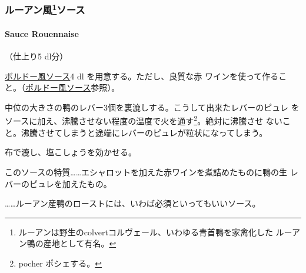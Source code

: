 \begin{recette}
\maeaki

\hypertarget{ux30ebux30fcux30a2ux30f3ux98a884ux30bdux30fcux30b9}{%
\subsubsection[ルーアン風ソース]{\texorpdfstring{ルーアン風\footnote{ルーアンは野生のcolvertコルヴェール、いわゆる青首鴨を家禽化した
  ルーアン鴨の産地として有名。}ソース}{ルーアン風ソース}}\label{ux30ebux30fcux30a2ux30f3ux98a884ux30bdux30fcux30b9}}

\hypertarget{sauce-rouennaise}{%
\paragraph{Sauce Rouennaise}\label{sauce-rouennaise}}


（仕上り5 dl分）

\protect\hyperlink{sauce-bordelaise}{ボルドー風ソース}4 dl
を用意する。ただし、良質な赤
ワインを使って作ること。（\protect\hyperlink{sauce-bordelaise}{ボルドー風ソース}参照）。

中位の大きさの鴨のレバー3個を裏漉しする。こうして出来たレバーのピュレ
をソースに加え、沸騰させない程度の温度で火を通す\footnote{pocher
  ポシェする。}。絶対に沸騰させ
ないこと。沸騰させてしまうと途端にレバーのピュレが粒状になってしまう。

布で漉し、塩こしょうを効かせる。

このソースの特質\ldots{}\ldots{}エシャロットを加えた赤ワインを煮詰めたものに鴨の生
レバーのピュレを加えたもの。

\ldots{}\ldots{}ルーアン産鴨のローストには、いわば必須といってもいいソース。

\maeaki

\hypertarget{ux30bdux30fcux30b9ux30b5ux30ebux30df92}{%
}
\end{recette}
